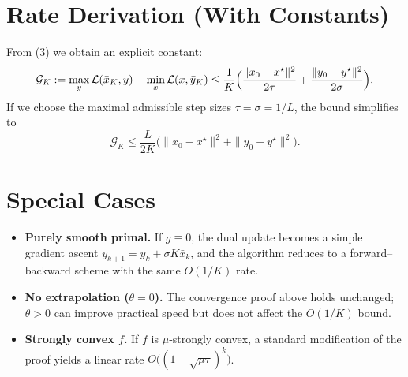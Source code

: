 \documentclass{article}
\begin{document}
\section*{Rate Derivation (With Constants)}
From (3) we obtain an explicit constant:
\[
\mathcal G_{K}:=
\max_{y}\mathcal L(\bar x_{K},y)-\min_{x}\mathcal L(x,\bar y_{K})
\le
\frac{1}{K}\Bigl(\frac{\|x_{0}-x^{\star}\|^{2}}{2\tau}
+\frac{\|y_{0}-y^{\star}\|^{2}}{2\sigma}\Bigr).
\]
If we choose the maximal admissible step sizes $\tau=\sigma=1/L$, the bound simplifies to
\[
\mathcal G_{K}\le
\frac{L}{2K}\bigl(\|x_{0}-x^{\star}\|^{2}+\|y_{0}-y^{\star}\|^{2}\bigr).
\]

\section*{Special Cases}
\begin{itemize}
  \item \textbf{Purely smooth primal.} If $g\equiv0$, the dual update becomes a simple gradient ascent $y_{k+1}=y_{k}+\sigma K\bar x_{k}$, and the algorithm reduces to a forward–backward scheme with the same $O(1/K)$ rate.
  \item \textbf{No extrapolation ($\theta=0$).} The convergence proof above holds unchanged; $\theta>0$ can improve practical speed but does not affect the $O(1/K)$ bound.
  \item \textbf{Strongly convex $f$.} If $f$ is $\mu$‑strongly convex, a standard modification of the proof yields a linear rate $O\bigl((1-\sqrt{\mu\tau})^{k}\bigr)$.
\end{itemize}
\end{document}
